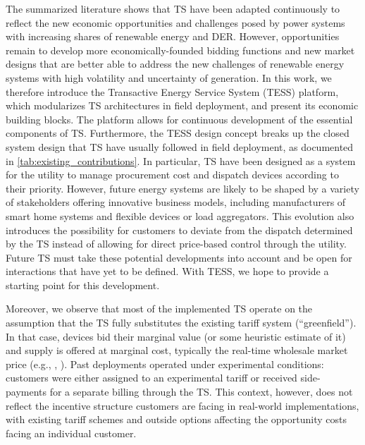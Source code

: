 The summarized literature shows that TS have been adapted continuously to reflect the new economic opportunities and challenges posed by power systems with increasing shares of renewable energy and DER.
However, opportunities remain to develop more economically-founded bidding functions and new market designs that are better able to address the new challenges of renewable energy systems with high volatility and uncertainty of generation.
In this work, we therefore introduce the Transactive Energy Service System (TESS) platform, which modularizes TS architectures in field deployment, and present its economic building blocks. 
The platform allows for continuous development of the essential components of TS.
Furthermore, the TESS design concept breaks up the closed system design that TS have usually followed in field deployment, as documented in \cref{tab:existing_contributions}. In particular, TS have been designed as a system for the utility to manage procurement cost and dispatch devices according to their priority. However, future energy systems are likely to be shaped by a variety of stakeholders offering innovative business models, including manufacturers of smart home systems and flexible devices or load aggregators. This evolution also introduces the possibility for customers to deviate from the dispatch determined by the TS instead of allowing for direct price-based control through the utility. 
Future TS must take these potential developments into account and be open for interactions that have yet to be defined. With TESS, we hope to provide a starting point for this development.

Moreover, we observe that most of the implemented TS operate on the assumption that the TS fully substitutes the existing tariff system (``greenfield''). 
In that case, devices bid their marginal value (or some heuristic estimate of it) and supply is offered at marginal cost, typically the real-time wholesale market price (e.g., \citet{PNNL2006}, \citet{katipamula_transactive_2017}). Past deployments operated under experimental conditions: customers were either assigned to an experimental tariff or received side-payments for a separate billing through the TS. This context, however, does not reflect the incentive structure customers are facing in real-world implementations, with existing tariff schemes and outside options affecting the opportunity costs facing an individual customer. 

